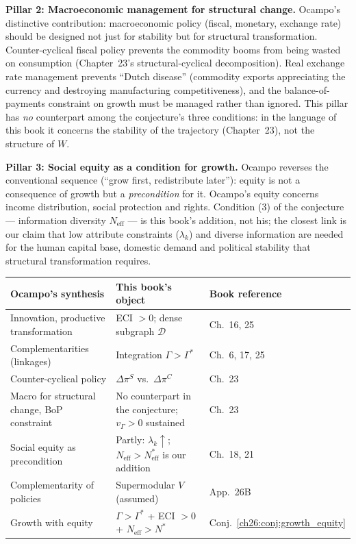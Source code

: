 \documentclass[../structural_economics_book.tex]{subfiles}
\begin{document}
\textbf{Pillar 2: Macroeconomic management for structural change.} Ocampo's distinctive contribution: macroeconomic policy (fiscal, monetary, exchange rate) should be designed not just for stability but for structural transformation. Counter-cyclical fiscal policy prevents the commodity booms from being wasted on consumption (Chapter~23's structural-cyclical decomposition). Real exchange rate management prevents ``Dutch disease'' (commodity exports appreciating the currency and destroying manufacturing competitiveness), and the balance-of-payments constraint on growth must be managed rather than ignored. This pillar has \emph{no} counterpart among the conjecture's three conditions: in the language of this book it concerns the stability of the trajectory (Chapter~23), not the structure of $W$.

\textbf{Pillar 3: Social equity as a condition for growth.} Ocampo reverses the conventional sequence (``grow first, redistribute later''): equity is not a consequence of growth but a \textit{precondition} for it. Ocampo's equity concerns income distribution, social protection and rights. Condition (3) of the conjecture --- information diversity $N_{\text{eff}}$ --- is this book's addition, not his; the closest link is our claim that low attribute constraints ($\lambda_k$) and diverse information are needed for the human capital base, domestic demand and political stability that structural transformation requires.

\begin{center}
\begin{tabularx}{\textwidth}{LLL}
\toprule
\textbf{Ocampo's synthesis} & \textbf{This book's object} & \textbf{Book reference} \\
\midrule
Innovation, productive transformation & ECI $> 0$; dense subgraph $\mathcal{D}$ & Ch.~16, 25 \\
Complementarities (linkages) & Integration $\Gamma > \Gamma^*$ & Ch.~6, 17, 25 \\
Counter-cyclical policy & $\Delta\pi^S$ vs.\ $\Delta\pi^C$ & Ch.~23 \\
Macro for structural change, BoP constraint & No counterpart in the conjecture; $v_\Gamma > 0$ sustained & Ch.~23 \\
Social equity as precondition & Partly: $\lambda_k \uparrow$; $N_{\text{eff}} > N^*_{\text{eff}}$ is our addition & Ch.~18, 21 \\
Complementarity of policies & Supermodular $V$ (assumed) & App.~26B \\
Growth with equity & $\Gamma > \Gamma^*$ + ECI $> 0$ + $N_{\text{eff}} > N^*$ & Conj.~\ref{ch26:conj:growth_equity} \\
\bottomrule
\end{tabularx}
\end{center}
\end{document}
